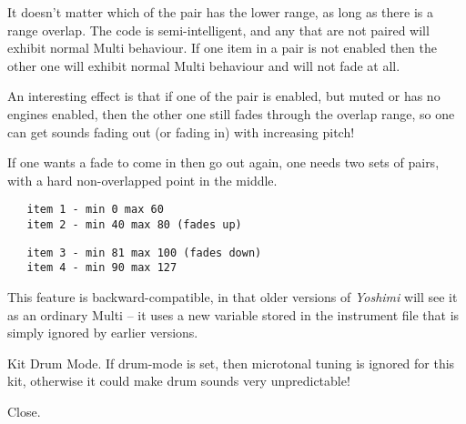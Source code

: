    It doesn't matter which of the pair has the lower range, as long as there is
   a range overlap. The code is semi-intelligent, and any that are not paired
   will exhibit normal Multi behaviour. If one item in a pair is not enabled
   then the other one will exhibit normal Multi behaviour and will not fade at
   all.

   An interesting effect is that if one of the pair is enabled, but muted or
   has no engines enabled, then the other one still fades through the overlap
   range, so one can get sounds fading out (or fading in) with increasing
   pitch!

   If one wants a fade to come in then go out again, one needs two sets of pairs,
   with a hard non-overlapped point in the middle.

   \begin{verbatim}
   item 1 - min 0 max 60
   item 2 - min 40 max 80 (fades up)
   \end{verbatim}

   \begin{verbatim}
   item 3 - min 81 max 100 (fades down)
   item 4 - min 90 max 127
   \end{verbatim}

   This feature is backward-compatible, in that older versions of
   \textsl{Yoshimi} will
   see it as an ordinary Multi -- it uses a new variable stored in the
   instrument file that is simply ignored by earlier versions.

   Kit Drum Mode.
   If drum-mode  is set, then microtonal tuning is ignored for this kit,
   otherwise it could make drum sounds very unpredictable!

   Close.

